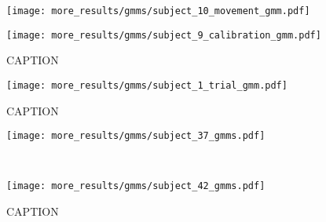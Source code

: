 \documentclass[../main.tex]{subfiles}
\begin{document}
\begin{figure}[H]%
  \centering
  \begin{minipage}{0.49\textwidth}
    \texttt{[image: more\_results/gmms/subject\_10\_movement\_gmm.pdf]}
    \subcaption{}
  \end{minipage}%
  \begin{minipage}{0.49\textwidth}
    \texttt{[image: more\_results/gmms/subject\_9\_calibration\_gmm.pdf]}
    \subcaption{}
  \end{minipage}
  \caption[Example prior GMMs]{CAPTION}\label{fig:example_prior_gmms}
\end{figure}


\begin{figure}[H]%
  \centering
    \texttt{[image: more\_results/gmms/subject\_1\_trial\_gmm.pdf]}
    \caption[Subject 1 trial GMMs overlayed on trajectories]{CAPTION}\label{fig:example_1_trial_data_gmms}
\end{figure}





\begin{figure}[H]%
  \centering
  \begin{minipage}{\textwidth}
    \texttt{[image: more\_results/gmms/subject\_37\_gmms.pdf]}
    \subcaption{}
  \end{minipage}\\%
  \begin{minipage}{\textwidth}
    \texttt{[image: more\_results/gmms/subject\_42\_gmms.pdf]}
    \subcaption{}
  \end{minipage}
  \caption[Example trial GMMs for subjects 37 and 42]{CAPTION}\label{fig:example_trial_gmms}
\end{figure}
\end{document}
